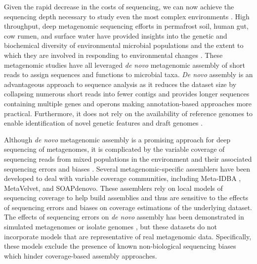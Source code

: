 \documentclass[10pt]{article}
\begin{document}
Given the rapid decrease in the costs of sequencing, we can now
achieve the sequencing depth necessary to study even the most complex
environments \cite{Hess:2011p686,Qin:2010p189}.  High throughput, deep
metagenomic sequencing efforts in permafrost soil, human gut, cow
rumen, and surface water have provided insights into the genetic and
biochemical diversity of environmental microbial populations
\cite{Hess:2011p686,Iverson:2012p1281,Qin:2010p189} and the extent to
which they are involved in responding to environmental changes
\cite{Mackelprang:2011p1087}. These metagenomic studies have all
leveraged \emph{de novo} metagenomic assembly of short reads to assign
sequences and functions to microbial taxa.  \emph{De novo} assembly is
an advantageous approach to sequence analysis as it reduces the
dataset size by collapsing numerous short reads into fewer contigs and
provides longer sequences containing multiple genes and operons
\cite{Miller:2010p226,Pop:2009p798} making annotation-based approaches
more practical.  Furthermore, it does not rely on the availability of
reference genomes to enable identification of novel genetic features
and draft genomes \cite{Hess:2011p686,Iverson:2012p1281}.

Although \emph{de novo} metagenomic assembly is a promising approach
for deep sequencing of metagenomes, it is complicated by the variable
coverage of sequencing reads from mixed populations in the environment
and their associated sequencing errors and biases
\cite{Mende:2012p1262,Pignatelli:2011p742}. Several
metagenomic-specific assemblers have been developed to deal with
variable coverage communities, including Meta-IDBA
\cite{Peng:2011p898}, MetaVelvet, and SOAPdenovo.  These assemblers
rely on local models of sequencing coverage to help build assemblies
and thus are sensitive to the effects of sequencing errors and biases
on coverage estimations of the underlying dataset. The effects of
sequencing errors on \emph{de novo} assembly has been demonstrated in
simulated metagenomes
\cite{Mavromatis:2006p894,Mende:2012p1262,Pignatelli:2011p742} or
isolate genomes \cite{Morgan:2010p740}, but these datasets do not
incorporate models that are representative of real metagenomic data.
Specifically, these models exclude the presence of known
non-biological sequencing biases
\cite{GomezAlvarez:2009p1334,Keegan:2012p1336,Niu:2010p1333} which
hinder coverage-based assembly approaches.
\end{document}
